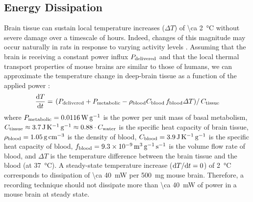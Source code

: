 \subsection{Energy Dissipation}

Brain tissue can sustain local temperature increases ($\Delta T$) of \SI{\ca 2}{\celsius} without severe damage over a timescale of hours. Indeed, changes of this magnitude may occur naturally in rats in response to varying activity levels \cite{Wolf2008}.
Assuming that the brain is receiving a constant power influx $P_{\text{\scriptsize delivered}}$ and that the local thermal transport properties of mouse brains are similar to those of humans, we can approximate the temperature change in deep-brain tissue as a function of the applied power \cite{sotero11, Lazzi2005}:
\[\frac{\text{d} T}{\text{d} t} = \left.\left(P_{\text{\scriptsize delivered}} + P_{\text{\scriptsize metabolic}} - \rho_{\text{\scriptsize blood}} C_{\text{\scriptsize blood}}\,f_{\text{\scriptsize blood}} \Delta T\right)\right/C_{\text{\scriptsize tissue}}\]
where $P_{\text{\scriptsize metabolic}} = \SI{0.0116}{\watt\per\gram}$ is the power per unit mass of basal metabolism, $C_{\text{\scriptsize tissue}} \approx \SI{3.7}{\joule\per\kelvin\per\gram} \approx 0.88\cdot C_{\text{\scriptsize water}}$ is the specific heat capacity of brain tissue, $\rho_{\text{\scriptsize blood}}=\SI{1.05}{\gram\per\centi\meter\cubed}$ is the density of blood, $C_{\text{\scriptsize blood}} = \SI{3.9}{\joule\per\kelvin\per\gram}$ is the specific heat capacity of blood, $f_{\text{\scriptsize blood}} = \SI{9.3e-9}{\meter\cubed\per\gram\per\second}$ is the volume flow rate of blood, and $\Delta T$ is the temperature difference between the brain tissue and the blood (at \SI{37}{\celsius}).
A steady-state temperature increase ($\text{d} T/\text{d} t = 0$) of \SI{2}{\celsius} corresponds to dissipation of \SI{\ca 40}{\milli\watt} per \SI{500}{\milli\gram} mouse brain.
Therefore, a recording technique should not dissipate more than \SI{\ca 40}{\milli\watt} of power in a mouse brain at steady state.

